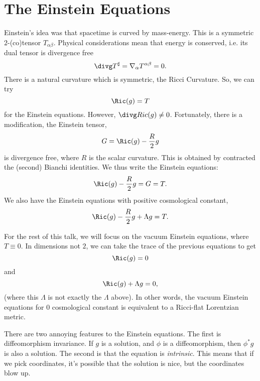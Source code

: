 \documentclass[12pt]{article}
\begin{document}
\section{The Einstein Equations}
Einstein's idea was that spacetime is curved by mass-energy. This is a symmetric $2$-(co)tensor $T_{\alpha\beta}$. Physical considerations mean that energy is conserved, i.e. its dual tensor is divergence free
\[\divg T^{\sharp} = \nabla_{\alpha}T^{\alpha\beta} = 0.\]
There is a natural curvature which is symmetric, the Ricci Curvature. So, we can try
\[\Ric(g) = T\] for the Einstein equations. However, $\divg Ric(g) \neq 0$. Fortunately, there is a modification, the Einstein tensor,
\[G = \Ric(g) - \frac{R}{2}g\] is divergence free, where $R$ is the scalar curvature. This is obtained by contracted the (second) Bianchi identities. We thus write the Einstein equations:
\[\Ric(g) -\frac{R}{2}g = G = T.\]  We also have the Einstein equations with positive cosmological constant,
\[\Ric(g)-\frac{R}{2}g + \Lambda g = T.\]

For the rest of this talk, we will focus on the vacuum Einstein equations, where $T \equiv 0$. In dimensions not $2$, we can take the trace of the previous equations to get
\[\Ric(g) = 0\]
and
\[\Ric(g) + \Lambda g = 0,\] (where this $\Lambda$ is not exactly the $\Lambda$ above). In other words, the vacuum Einstein equations for $0$ cosmological constant is equivalent to a Ricci-flat Lorentzian metric.

There are two annoying features to the Einstein equations. The first is diffeomorphism invariance. If $g$ is a solution, and $\phi$ is a diffeomorphism, then $\phi^{\ast}g$ is also a solution. The second is that the equation is \emph{intrinsic}. This means that if we pick coordinates, it's possible that the solution is nice, but the coordinates blow up.
\end{document}
